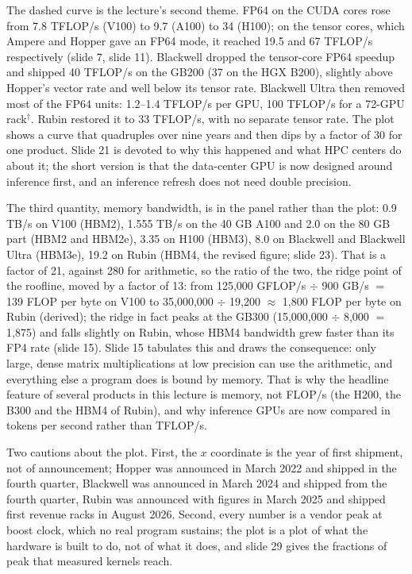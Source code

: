 \documentclass[11pt,letterpaper]{article}
\begin{document}
The dashed curve is the lecture's second theme. FP64 on the CUDA cores rose from 7.8 TFLOP/s (V100) to 9.7 (A100) to 34 (H100); on the tensor cores, which Ampere and Hopper gave an FP64 mode, it reached 19.5 and 67 TFLOP/s respectively (slide 7, slide 11). Blackwell dropped the tensor-core FP64 speedup and shipped 40 TFLOP/s on the GB200 (37 on the HGX B200), slightly above Hopper's vector rate and well below its tensor rate. Blackwell Ultra then removed most of the FP64 units: 1.2--1.4 TFLOP/s per GPU, 100 TFLOP/s for a 72-GPU rack$^\dagger$. Rubin restored it to 33 TFLOP/s, with no separate tensor rate. The plot shows a curve that quadruples over nine years and then dips by a factor of 30 for one product. Slide 21 is devoted to why this happened and what HPC centers do about it; the short version is that the data-center GPU is now designed around inference first, and an inference refresh does not need double precision.

The third quantity, memory bandwidth, is in the panel rather than the plot: 0.9 TB/s on V100 (HBM2), 1.555 TB/s on the 40 GB A100 and 2.0 on the 80 GB part (HBM2 and HBM2e), 3.35 on H100 (HBM3), 8.0 on Blackwell and Blackwell Ultra (HBM3e), 19.2 on Rubin (HBM4, the revised figure; slide 23). That is a factor of 21, against 280 for arithmetic, so the ratio of the two, the ridge point of the roofline, moved by a factor of 13: from 125,000 GFLOP/s $\div$ 900 GB/s $=$ 139 FLOP per byte on V100 to 35,000,000 $\div$ 19,200 $\approx$ 1,800 FLOP per byte on Rubin (derived); the ridge in fact peaks at the GB300 (15,000,000 $\div$ 8,000 $=$ 1,875) and falls slightly on Rubin, whose HBM4 bandwidth grew faster than its FP4 rate (slide 15). Slide 15 tabulates this and draws the consequence: only large, dense matrix multiplications at low precision can use the arithmetic, and everything else a program does is bound by memory. That is why the headline feature of several products in this lecture is memory, not FLOP/s (the H200, the B300 and the HBM4 of Rubin), and why inference GPUs are now compared in tokens per second rather than TFLOP/s.

Two cautions about the plot. First, the $x$ coordinate is the year of first shipment, not of announcement; Hopper was announced in March 2022 and shipped in the fourth quarter, Blackwell was announced in March 2024 and shipped from the fourth quarter, Rubin was announced with figures in March 2025 and shipped first revenue racks in August 2026. Second, every number is a vendor peak at boost clock, which no real program sustains; the plot is a plot of what the hardware is built to do, not of what it does, and slide 29 gives the fractions of peak that measured kernels reach.
\end{document}
